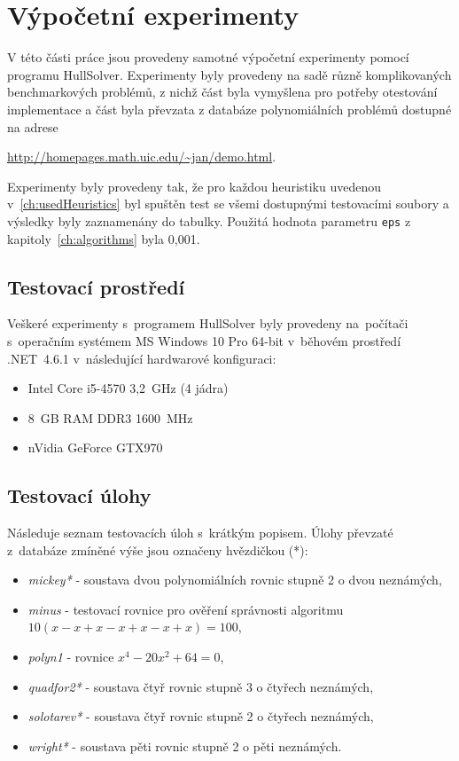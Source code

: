 


\chapter{Výpočetní experimenty}
V této části práce jsou provedeny samotné výpočetní experimenty pomocí programu HullSolver. Experimenty byly provedeny na sadě různě komplikovaných benchmarkových problémů, z nichž část byla vymyšlena pro potřeby otestování implementace a část byla převzata z databáze polynomiálních problémů dostupné na adrese {\url{http://homepages.math.uic.edu/~jan/demo.html}.

Experimenty byly provedeny tak, že pro každou heuristiku uvedenou v~\ref{ch:usedHeuristics} byl spuštěn test se všemi dostupnými testovacími soubory a výsledky byly zaznamenány do tabulky. Použitá hodnota parametru \verb|eps| z kapitoly~\ref{ch:algorithms} byla 0,001.


\section{Testovací prostředí}
Veškeré experimenty s~programem HullSolver byly provedeny na~počítači s~operačním systémem MS Windows 10 Pro 64-bit v~běhovém prostředí .NET~4.6.1 v~následující hardwarové konfiguraci:

\begin{itemize}
\item Intel Core i5-4570 3,2~GHz (4 jádra)
\item 8~GB RAM DDR3 1600~MHz
\item nVidia GeForce GTX970
\end{itemize}

\section{Testovací úlohy}

Následuje seznam testovacích úloh s~krátkým popisem. Úlohy převzaté z~databáze zmíněné výše jsou označeny hvězdičkou (*):

\begin{itemize}
    \item \emph{mickey*} - soustava dvou polynomiálních rovnic stupně 2 o dvou neznámých,
    \item \emph{minus} - testovací rovnice pro ověření správnosti algoritmu $10(x - x + x - x + x - x + x) = 100$,
    \item \emph{polyn1} - rovnice $x^4 - 20x^2 + 64 = 0$,
    \item \emph{quadfor2*} - soustava čtyř rovnic stupně 3 o čtyřech neznámých,
    \item \emph{solotarev*} - soustava čtyř rovnic stupně 2 o čtyřech neznámých,
    \item \emph{wright*} - soustava pěti rovnic stupně 2 o pěti neznámých.
\end{itemize}

}
